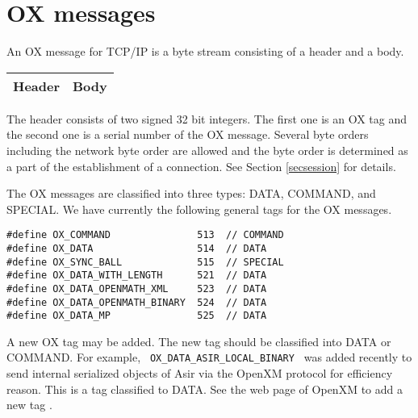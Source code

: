 
\section{OX messages}

An OX message for TCP/IP is a byte stream consisting of
a header and a body.
\begin{center}
\begin{tabular}{|c|c|}
\hline
Header	& \hspace{10mm} Body \hspace{10mm} \\
\hline
\end{tabular}
\end{center}
The header consists of two signed 32 bit integers.
The first one is an OX tag 
and the second one is a serial number of the OX message.
Several byte orders including the network byte order
are allowed and the byte order is determined as a part of
the establishment of a connection. See Section \ref{secsession} for details.

The OX messages are classified into three types:
DATA, COMMAND, and SPECIAL.
We have currently the following general tags for the OX messages.
\begin{verbatim}
#define	OX_COMMAND               513  // COMMAND
#define	OX_DATA	                 514  // DATA
#define OX_SYNC_BALL             515  // SPECIAL
#define OX_DATA_WITH_LENGTH      521  // DATA
#define OX_DATA_OPENMATH_XML     523  // DATA
#define OX_DATA_OPENMATH_BINARY  524  // DATA
#define OX_DATA_MP               525  // DATA
\end{verbatim}

A new OX tag may be added.
The new tag should be classified into DATA or COMMAND.
For example, \verb+ OX_DATA_ASIR_LOCAL_BINARY +  was added recently
to send internal serialized objects of Asir via the OpenXM protocol
for efficiency reason.
This is a tag classified to DATA.
See the web page of OpenXM to add a new tag \cite{openxm-web}.

%
